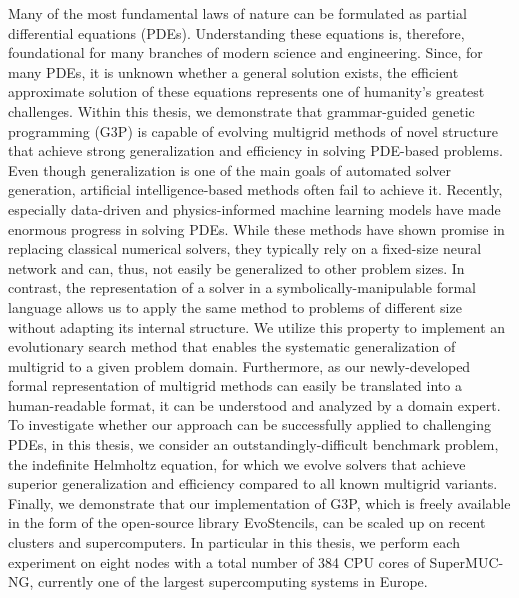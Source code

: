 Many of the most fundamental laws of nature can be formulated as partial differential equations (PDEs). Understanding these equations is, therefore, foundational for many branches of modern science and engineering. Since, for many PDEs, it is unknown whether a general solution exists, the efficient approximate solution of these equations represents one of humanity's greatest challenges. Within this thesis, we demonstrate that grammar-guided genetic programming (G3P) is capable of evolving multigrid methods of novel structure that achieve strong generalization and efficiency in solving PDE-based problems. 
Even though generalization is one of the main goals of automated solver generation, artificial intelligence-based methods often fail to achieve it. Recently, especially data-driven and physics-informed machine learning models have made enormous progress in solving PDEs. While these methods have shown promise in replacing classical numerical solvers, they typically rely on a fixed-size neural network and can, thus, not easily be generalized to other problem sizes.
In contrast, the representation of a solver in a symbolically-manipulable formal language allows us to apply the same method to problems of different size without adapting its internal structure. We utilize this property to implement an evolutionary search method that enables the systematic generalization of multigrid to a given problem domain. Furthermore, as our newly-developed formal representation of multigrid methods can easily be translated into a human-readable format, it can be understood and analyzed by a domain expert. To investigate whether our approach can be successfully applied to challenging PDEs, in this thesis, we consider an outstandingly-difficult benchmark problem, the indefinite Helmholtz equation, for which we evolve solvers that achieve superior generalization and efficiency compared to all known multigrid variants.
Finally, we demonstrate that our implementation of G3P, which is freely available in the form of the open-source library EvoStencils, can be scaled up on recent clusters and supercomputers. In particular in this thesis, we perform each experiment on eight nodes with a total number of 384 CPU cores of SuperMUC-NG, currently one of the largest supercomputing systems in Europe.